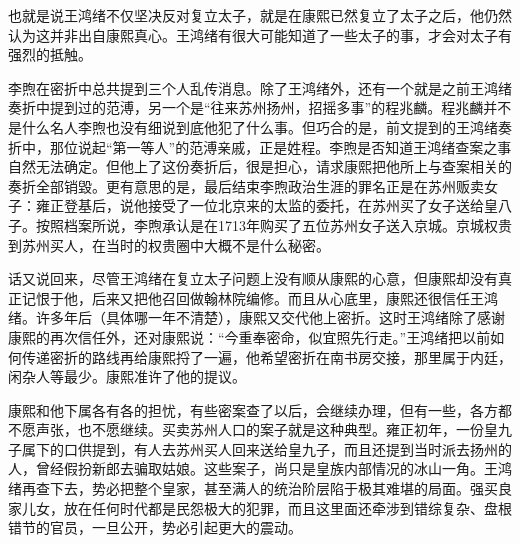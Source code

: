 
也就是说王鸿绪不仅坚决反对复立太子，就是在康熙已然复立了太子之后，他仍然认为这并非出自康熙真心。王鸿绪有很大可能知道了一些太子的事，才会对太子有强烈的抵触。



李煦在密折中总共提到三个人乱传消息。除了王鸿绪外，还有一个就是之前王鸿绪奏折中提到过的范溥，另一个是“往来苏州扬州，招摇多事”的程兆麟。程兆麟并不是什么名人李煦也没有细说到底他犯了什么事。但巧合的是，前文提到的王鸿绪奏折中，那位说起“第一等人”的范溥亲戚，正是姓程。李煦是否知道王鸿绪查案之事自然无法确定。但他上了这份奏折后，很是担心，请求康熙把他所上与查案相关的奏折全部销毀。更有意思的是，最后结束李煦政治生涯的罪名正是在苏州贩卖女子：雍正登基后，说他接受了一位北京来的太监的委托，在苏州买了女子送给皇八子。按照档案所说，李煦承认是在1713年购买了五位苏州女子送入京城。京城权贵到苏州买人，在当时的权贵圈中大概不是什么秘密。



话又说回来，尽管王鸿绪在复立太子问题上没有顺从康熙的心意，但康熙却没有真正记恨于他，后来又把他召回做翰林院编修。而且从心底里，康熙还很信任王鸿绪。许多年后（具体哪一年不清楚），康熙又交代他上密折。这时王鸿绪除了感谢康熙的再次信任外，还对康熙说：“今重奉密命，似宜照先行走。”王鸿绪把以前如何传递密折的路线再给康熙捋了一遍，他希望密折在南书房交接，那里属于内廷，闲杂人等最少。康熙准许了他的提议。



康熙和他下属各有各的担忧，有些密案查了以后，会继续办理，但有一些，各方都不愿声张，也不愿继续。买卖苏州人口的案子就是这种典型。雍正初年，一份皇九子属下的口供提到，有人去苏州买人回来送给皇九子，而且还提到当时派去扬州的人，曾经假扮新郎去骗取姑娘。这些案子，尚只是皇族内部情况的冰山一角。王鸿绪再查下去，势必把整个皇家，甚至满人的统治阶层陷于极其难堪的局面。强买良家儿女，放在任何时代都是民怨极大的犯罪，而且这里面还牵涉到错综复杂、盘根错节的官员，一旦公开，势必引起更大的震动。


